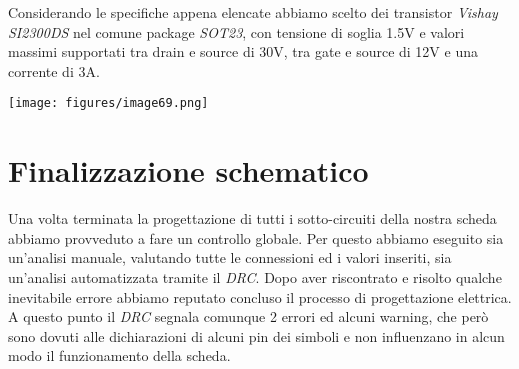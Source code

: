 \noindent Considerando le specifiche appena elencate abbiamo scelto dei transistor
\textit{Vishay SI2300DS} nel comune package \textit{SOT23}, con tensione di soglia 1.5V e
valori massimi supportati tra drain e source di 30V, tra gate e source
di 12V e una corrente di 3A.

\begin{center}
\texttt{[image: figures/image69.png]}
\captionsetup{type=figure}
\end{center}

\hypertarget{finalizzazione schematico}{%
\section{Finalizzazione schematico}\label{finalizzazione schematico}}

Una volta terminata la progettazione di tutti i sotto-circuiti della 
nostra scheda abbiamo provveduto a fare un controllo globale. Per questo abbiamo eseguito 
sia un’analisi manuale, valutando tutte le connessioni ed i valori inseriti, sia un’analisi 
automatizzata tramite il \textit{DRC}. Dopo aver riscontrato e risolto qualche inevitabile errore 
abbiamo reputato concluso il processo di progettazione elettrica. A questo punto il \textit{DRC} 
segnala comunque 2 errori ed alcuni warning, che però sono dovuti alle dichiarazioni di alcuni 
pin dei simboli e non influenzano in alcun modo il funzionamento della scheda.